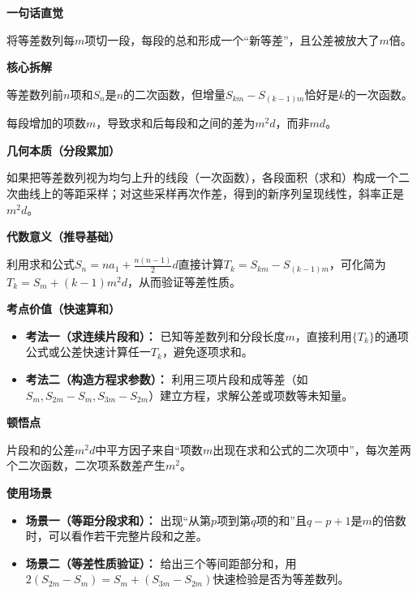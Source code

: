 \begin{explanationbox}

	\textbf{\textcolor{CExplanation}{一句话直觉}}

	将等差数列每$m$项切一段，每段的总和形成一个“新等差”，且公差被放大了$m$倍。

	\medskip
	\textbf{\textcolor{CExplanation}{核心拆解}}
	\begin{description}[style=nextline, leftmargin=2.8em, labelsep=0.5em, itemsep=0.45em]
		\item[\textbf{要点一（线性叠加）：}] 等差数列前$n$项和$S_n$是$n$的二次函数，但增量$S_{km}-S_{(k-1)m}$恰好是$k$的一次函数。
		\item[\textbf{要点二（平方因子）：}] 每段增加的项数$m$，导致求和后每段和之间的差为$m^2 d$，而非$m d$。
	\end{description}

	\medskip
	\textbf{\textcolor{CExplanation}{几何本质（分段累加）}}

	如果把等差数列视为均匀上升的线段（一次函数），各段面积（求和）构成一个二次曲线上的等距采样；对这些采样再次作差，得到的新序列呈现线性，斜率正是$m^2 d$。

	\medskip
	\textbf{\textcolor{CExplanation}{代数意义（推导基础）}}

	利用求和公式$S_n = n a_1 + \frac{n(n-1)}{2}d$直接计算$T_k = S_{km}-S_{(k-1)m}$，可化简为$T_k = S_m + (k-1)m^2 d$，从而验证等差性质。

	\medskip
	\textbf{\textcolor{CExplanation}{考点价值（快速算和）}}
	\begin{itemize}[leftmargin=*, itemsep=0.5em, topsep=0.4em]
		\item \textbf{考法一（求连续片段和）：} 已知等差数列和分段长度$m$，直接利用$\{T_k\}$的通项公式或公差快速计算任一$T_k$，避免逐项求和。
		\item \textbf{考法二（构造方程求参数）：} 利用三项片段和成等差（如$S_m, S_{2m}-S_m, S_{3m}-S_{2m}$）建立方程，求解公差或项数等未知量。
	\end{itemize}

	\medskip
	\textbf{\textcolor{CExplanation}{顿悟点}}

	片段和的公差$m^2 d$中平方因子来自“项数$m$出现在求和公式的二次项中”，每次差两个二次函数，二次项系数差产生$m^2$。

	\medskip
	\textbf{\textcolor{CExplanation}{使用场景}}
	\begin{itemize}[leftmargin=*, itemsep=0.5em, topsep=0.4em]
		\item \textbf{场景一（等距分段求和）：} 出现“从第$p$项到第$q$项的和”且$q-p+1$是$m$的倍数时，可以看作若干完整片段和之差。
		\item \textbf{场景二（等差性质验证）：} 给出三个等间距部分和，用$2(S_{2m}-S_m)=S_m+(S_{3m}-S_{2m})$快速检验是否为等差数列。
	\end{itemize}

\end{explanationbox}
